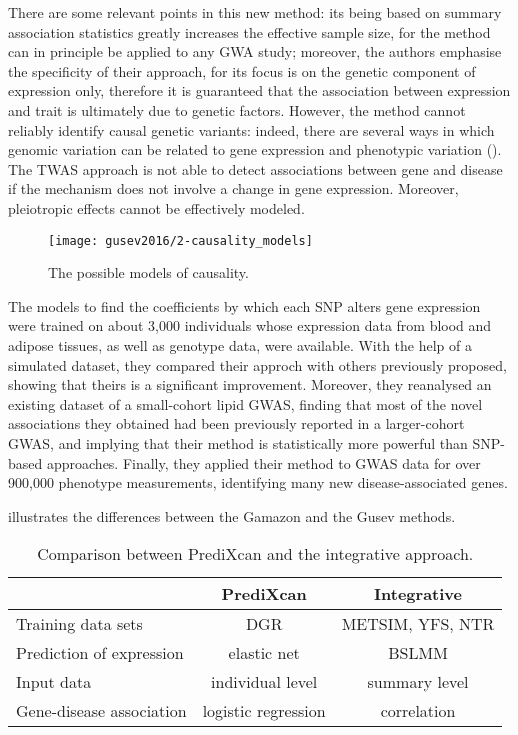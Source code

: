 \documentclass[../main.tex]{subfiles}
\begin{document}
There are some relevant points in this new method: its being based on 
summary association statistics greatly increases the effective sample 
size, for the method can in principle be applied to any GWA study; 
moreover, the authors emphasise the specificity of their approach, for 
its focus is on the genetic component of expression only, therefore it 
is guaranteed that the association between expression and trait is 
ultimately due to genetic factors. However, the method cannot reliably identify 
causal genetic variants: indeed, there are several ways in which genomic 
variation can be related to gene expression and phenotypic variation 
(). The TWAS approach is not able to detect 
associations between gene and disease if the mechanism does not involve 
a change in gene expression. Moreover, pleiotropic effects cannot be 
effectively modeled.

\begin{figure}
	\texttt{[image: gusev2016/2-causality\_models]}
	\caption{The possible models of causality.}
\end{figure}

The models to find the coefficients by which each SNP alters gene 
expression were trained on about 3,000 individuals whose expression data 
from blood and adipose tissues, as well as genotype data, were 
available. With the help of a simulated dataset, they compared their 
approch with others previously proposed, showing that theirs is a 
significant improvement. Moreover, they reanalysed an existing dataset 
of a small-cohort lipid GWAS, finding that most of the novel 
associations they obtained had been previously reported in a 
larger-cohort GWAS, and implying that their method is statistically more 
powerful than SNP-based approaches. Finally, they applied their method 
to GWAS data for over 900,000 phenotype measurements, identifying many 
new disease-associated genes.

 illustrates the differences between the Gamazon and 
the Gusev methods.

\begin{table}
	\begin{tabular}{ l c c }
		\toprule
		& PrediXcan & Integrative \\
		\midrule
		Training data sets & DGR & METSIM, YFS, NTR \\
		Prediction of expression & elastic net & BSLMM \\
		Input data & individual level & summary level \\
		Gene-disease association & logistic regression & correlation \\
		\bottomrule
	\end{tabular}
	\caption{Comparison between PrediXcan and the integrative approach.}
\end{table}
\end{document}
